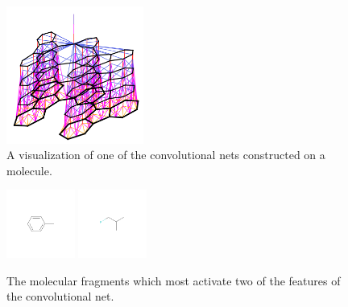 \documentclass{article} %
\begin{document}
\begin{figure}
\centerline{\includegraphics[width=0.4\textwidth]{figures/3d-nets/net1}}
\caption{A visualization of one of the convolutional nets constructed on a molecule.}
\label{placeholder}
\end{figure}

\begin{figure}
\centerline{
\includegraphics[width=0.2\textwidth]{figures/convnet-features/hidden-unit-0}
\includegraphics[width=0.2\textwidth]{figures/convnet-features/hidden-unit-1}}
\caption{The molecular fragments which most activate two of the features of the convolutional net.}
\label{placeholder}
\end{figure}
\end{document}
